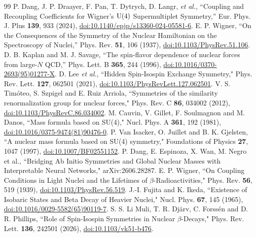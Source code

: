 \documentclass[aps,onecolumn,10pt,superscriptaddress,floatfix,nofootinbib]{revtex4}
\begin{document}
\begin{thebibliography}{99}
 P. Dang, J. P. Draayer, F. Pan, T. Dytrych, D. Langr, \textit{et al.}, ``Coupling and Recoupling Coefficients for Wigner's $\rm U(4)$ Supermultiplet Symmetry,'' Eur. Phys. J. Plus \textbf{139}, 933 (2024), \href{https://doi.org/10.1140/epjp/s13360-024-05581-6}{doi:10.1140/epjp/s13360-024-05581-6}.
 E. P. Wigner, ``On the Consequences of the Symmetry of the Nuclear Hamiltonian on the Spectroscopy of Nuclei,'' Phys. Rev. \textbf{51}, 106 (1937), \href{https://doi.org/10.1103/PhysRev.51.106}{doi:10.1103/PhysRev.51.106}.
 D. B. Kaplan and M. J. Savage, ``The spin-flavor dependence of nuclear forces from large-$N$ QCD,'' Phys. Lett. B \textbf{365}, 244 (1996), \href{https://doi.org/10.1016/0370-2693(95)01277-X}{doi:10.1016/0370-2693(95)01277-X}.
 D. Lee \textit{et al.}, ``Hidden Spin-Isospin Exchange Symmetry,"  Phys. Rev. Lett. \textbf{127}, 062501 (2021),  \href{https://doi.org/10.1103/PhysRevLett.127.062501}{doi:10.1103/PhysRevLett.127.062501}.
 V. S. Timóteo, S. Szpigel and E. Ruiz Arriola, ``Symmetries of the similarity renormalization group for nuclear forces," Phys. Rev. C \textbf{86}, 034002 (2012), \href{http://dx.doi.org/10.1103/PhysRevC.86.034002}{doi:10.1103/PhysRevC.86.034002}.
 M. Cauvin, V. Gillet, F. Soulmagnon and M. Danos, ``Mass formula based on SU(4)," Nucl. Phys. A \textbf{361}, 192 (1981), \href{https://doi.org/10.1016/0375-9474(81)90476-0}{doi:10.1016/0375-9474(81)90476-0}.
 P. Van Isacker, O. Juillet and B. K. Gjelsten, ``A nuclear mass formula based on SU(4) symmetry," Foundations of Physics \textbf{27}, 1047 (1997), \href{https://doi.org/10.1007/BF02551152}{doi:10.1007/BF02551152}.
 P. Dang, E. Espinoza, X. Wan, M. Negro et al., ``Bridging Ab Initio Symmetries and Global Nuclear Masses with Interpretable Neural Networks," arXiv:2606.28287.
 E. P. Wigner, ``On Coupling Conditions in Light Nuclei and the Lifetimes of $\beta$-Radioactivities," Phys. Rev. \textbf{56}, 519 (1939), \href{https://doi.org/10.1103/PhysRev.56.519}{doi:10.1103/PhysRev.56.519}.
 J.-I. Fujita and K. Ikeda, ``Existence of Isobaric States and Beta Decay of Heavier Nuclei," Nucl. Phys. \textbf{67}, 145 (1965), \href{https://doi.org/10.1016/0029-5582(65)90119-7}{doi:10.1016/0029-5582(65)90119-7}.
 S. S. Li Muli, T. R. Dj\"arv, C. Forss\'en and D. R. Phillips, ``Role of Spin-Isospin Symmetries in Nuclear $\ensuremath{\beta}$-Decays," Phys. Rev. Lett. \textbf{136}, 242501 (2026), \href{https://doi.org/10.1103/vk51-b476}{doi:10.1103/vk51-b476}.

\end{thebibliography}
\end{document}
